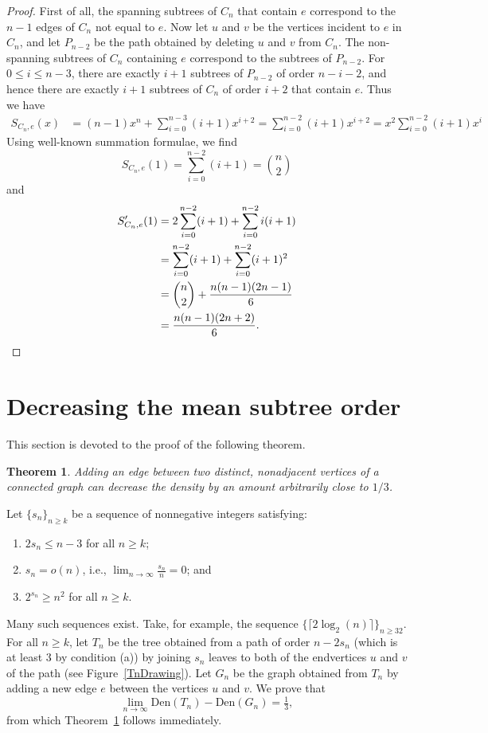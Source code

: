 \documentclass[12pt]{article}
\newcommand{\den}{\mbox{Den}}
\newtheorem{theorem}{Theorem}[section]
\theoremstyle{definition}
\begin{document}
\begin{proof}
First of all, the spanning subtrees of $C_n$ that contain $e$ correspond to the $n-1$ edges of $C_n$ not equal to $e$.  Now let $u$ and $v$ be the vertices incident to $e$ in $C_n$, and let $P_{n-2}$ be the path obtained by deleting $u$ and $v$ from $C_n$.  The non-spanning subtrees of $C_n$ containing $e$ correspond to the subtrees of $P_{n-2}$.  For $0\leq i\leq n-3$, there are exactly $i+1$ subtrees of $P_{n-2}$ of order $n-i-2$, and hence there are exactly $i+1$ subtrees of $C_n$ of order $i+2$ that contain $e$.  Thus we have
\begin{align*}
S_{C_n,e}(x)&=(n-1)x^n+\sum_{i=0}^{n-3}(i+1)x^{i+2}=\sum_{i=0}^{n-2}(i+1)x^{i+2}=x^2\sum_{i=0}^{n-2}(i+1)x^i
\end{align*}
Using well-known summation formulae, we find
\[
S_{C_n,e}(1)=\sum_{i=0}^{n-2}(i+1)=\binom{n}{2}
\]
and
\begin{align*}
S'_{C_n,e}(1)&=2\sum_{i=0}^{n-2}(i+1)+\sum_{i=0}^{n-2}i(i+1)\\
&=\sum_{i=0}^{n-2}(i+1)+\sum_{i=0}^{n-2}(i+1)^2\\
&=\binom{n}{2}+\frac{n(n-1)(2n-1)}{6}\\
&=\frac{n(n-1)(2n+2)}{6}.\qedhere
\end{align*}
\end{proof}

\section{Decreasing the mean subtree order}\label{CounterexampleSection}

This section is devoted to the proof of the following theorem.

\begin{theorem}\label{MainDecrease}
Adding an edge between two distinct, nonadjacent vertices of a connected graph can decrease the density by an amount arbitrarily close to $1/3$.
\end{theorem}

Let $\{s_n\}_{n\geq k}$ be a sequence of nonnegative integers satisfying:
\begin{enumerate}
    \item $2s_n\leq n-3$ for all $n\geq k$;
    \item $s_n=o(n)$, i.e., $\displaystyle\lim_{n\rightarrow\infty}\frac{s_n}{n}=0$; and
    \item $2^{s_n}\geq n^2$ for all $n\geq k$.
\end{enumerate}
Many such sequences exist.  Take, for example, the sequence $\{\lceil 2 \log_2(n)\rceil\}_{n\geq 32}$.
For all $n\geq k$, let $T_{n}$ be the tree obtained from a path of order $n-2s_n$ (which is at least $3$ by condition (a)) by joining $s_n$ leaves to both of the endvertices $u$ and $v$ of the path (see Figure~\ref{TnDrawing}).  Let $G_n$ be the graph obtained from $T_n$ by adding a new edge $e$ between the vertices $u$ and $v$.  We prove that
\[
\lim_{n\rightarrow\infty}\den(T_n)-\den(G_n)=\tfrac{1}{3},
\]
from which Theorem~\ref{MainDecrease} follows immediately.
\end{document}
